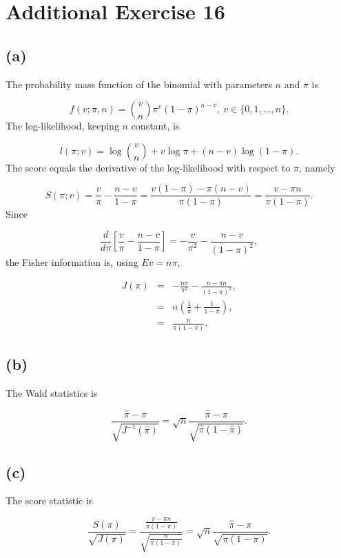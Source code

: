 

\section*{Additional Exercise 16}

\subsection*{(a)}

The probability mass function of the binomial with parameters $n$
and $\pi$ is

\[
f(v;\pi,n)={v \choose n}\pi^{v}(1-\pi)^{n-v},\:v\in\{0,1,\ldots,n\}.
\]
The log-likelihood, keeping $n$ constant, is 

\[
l(\pi;v)=\log{v \choose n}+v\log\pi+(n-v)\log(1-\pi).
\]
The score equals the derivative of the log-likelihood with respect
to $\pi$, namely

\[
S(\pi;v)=\frac{v}{\pi}-\frac{n-v}{1-\pi}=\frac{v(1-\pi)-\pi(n-v)}{\pi(1-\pi)}=\frac{v-\pi n}{\pi(1-\pi)}.
\]
Since 

\[
\frac{d}{d\pi}\left[\frac{v}{\pi}-\frac{n-v}{1-\pi}\right]=-\frac{v}{\pi^{2}}-\frac{n-v}{(1-\pi)^{2}},
\]
the Fisher information is, using $Ev=n\pi$,

\begin{eqnarray*}
J(\pi) & = & -\frac{n\pi}{\pi^{2}}-\frac{n-\pi n}{(1-\pi)^{2}},\\
 & = & n\left(\frac{1}{\pi}+\frac{1}{1-\pi}\right),\\
 & = & \frac{n}{\pi(1-\pi)}.
\end{eqnarray*}


\subsection*{(b)}

The Wald statistics is 

\[
\frac{\hat{\pi}-\pi}{\sqrt{J^{-1}(\hat{\pi})}}=\sqrt{n}\frac{\hat{\pi}-\pi}{\sqrt{\hat{\pi}(1-\hat{\pi})}}.
\]


\subsection*{(c)}

The score statistic is 

\[
\frac{S(\pi)}{\sqrt{J(\pi)}}=\frac{\frac{v-\pi n}{\pi(1-\pi)}}{\sqrt{\frac{n}{\pi(1-\pi)}}}=\sqrt{n}\frac{\hat{\pi}-\pi}{\sqrt{\pi(1-\pi)}}.
\]


